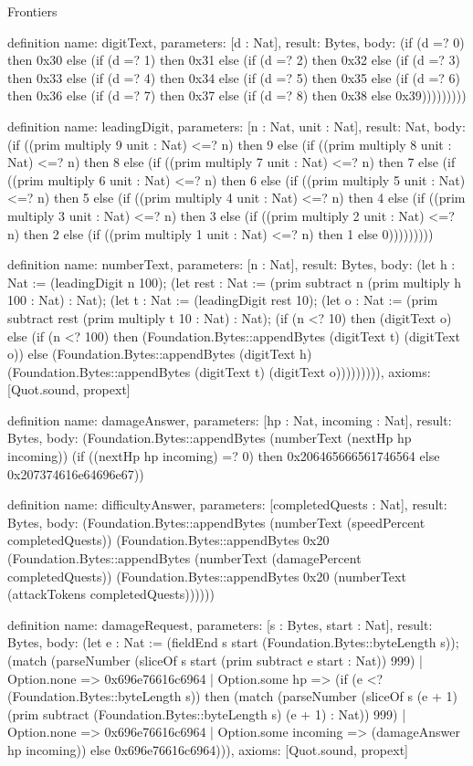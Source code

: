 \begin{lexlean}{Frontiers}
\begin{semanticmodule}
definition{
  name: digitText,
  parameters: [d : Nat],
  result: Bytes,
  body: (if (d =? 0) then 0x30 else (if (d =? 1) then 0x31 else (if (d =? 2) then 0x32 else (if (d =? 3) then 0x33 else (if (d =? 4) then 0x34 else (if (d =? 5) then 0x35 else (if (d =? 6) then 0x36 else (if (d =? 7) then 0x37 else (if (d =? 8) then 0x38 else 0x39)))))))))
}

definition{
  name: leadingDigit,
  parameters: [n : Nat, unit : Nat],
  result: Nat,
  body: (if ((prim multiply 9 unit : Nat) <=? n) then 9 else (if ((prim multiply 8 unit : Nat) <=? n) then 8 else (if ((prim multiply 7 unit : Nat) <=? n) then 7 else (if ((prim multiply 6 unit : Nat) <=? n) then 6 else (if ((prim multiply 5 unit : Nat) <=? n) then 5 else (if ((prim multiply 4 unit : Nat) <=? n) then 4 else (if ((prim multiply 3 unit : Nat) <=? n) then 3 else (if ((prim multiply 2 unit : Nat) <=? n) then 2 else (if ((prim multiply 1 unit : Nat) <=? n) then 1 else 0)))))))))
}

definition{
  name: numberText,
  parameters: [n : Nat],
  result: Bytes,
  body: (let h : Nat := (leadingDigit n 100); (let rest : Nat := (prim subtract n (prim multiply h 100 : Nat) : Nat); (let t : Nat := (leadingDigit rest 10); (let o : Nat := (prim subtract rest (prim multiply t 10 : Nat) : Nat); (if (n <? 10) then (digitText o) else (if (n <? 100) then (Foundation.Bytes::appendBytes (digitText t) (digitText o)) else (Foundation.Bytes::appendBytes (digitText h) (Foundation.Bytes::appendBytes (digitText t) (digitText o))))))))),
  axioms: [Quot.sound, propext]
}

definition{
  name: damageAnswer,
  parameters: [hp : Nat, incoming : Nat],
  result: Bytes,
  body: (Foundation.Bytes::appendBytes (numberText (nextHp hp incoming)) (if ((nextHp hp incoming) =? 0) then 0x206465666561746564 else 0x207374616e64696e67))
}

definition{
  name: difficultyAnswer,
  parameters: [completedQuests : Nat],
  result: Bytes,
  body: (Foundation.Bytes::appendBytes (numberText (speedPercent completedQuests)) (Foundation.Bytes::appendBytes 0x20 (Foundation.Bytes::appendBytes (numberText (damagePercent completedQuests)) (Foundation.Bytes::appendBytes 0x20 (numberText (attackTokens completedQuests))))))
}

definition{
  name: damageRequest,
  parameters: [s : Bytes, start : Nat],
  result: Bytes,
  body: (let e : Nat := (fieldEnd s start (Foundation.Bytes::byteLength s)); (match (parseNumber (sliceOf s start (prim subtract e start : Nat)) 999)
    | Option.none => 0x696e76616c6964
    | Option.some hp => (if (e <? (Foundation.Bytes::byteLength s)) then (match (parseNumber (sliceOf s (e + 1) (prim subtract (Foundation.Bytes::byteLength s) (e + 1) : Nat)) 999)
      | Option.none => 0x696e76616c6964
      | Option.some incoming => (damageAnswer hp incoming)) else 0x696e76616c6964))),
  axioms: [Quot.sound, propext]
}


\end{semanticmodule}
\end{lexlean}
